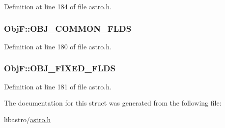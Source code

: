 Definition at line 184 of file astro.\-h.

\hypertarget{struct_obj_f_ac06485a349b8c66de064f281140c3741}{
\subsubsection[{O\-B\-J\-\_\-\-C\-O\-M\-M\-O\-N\-\_\-\-F\-L\-D\-S}]{\setlength{\rightskip}{0pt plus 5cm}Obj\-F\-::\-O\-B\-J\-\_\-\-C\-O\-M\-M\-O\-N\-\_\-\-F\-L\-D\-S}}\label{struct_obj_f_ac06485a349b8c66de064f281140c3741}


Definition at line 180 of file astro.\-h.

\hypertarget{struct_obj_f_a97411dd8e4c88e38ef9dd489836fe350}{
\subsubsection[{O\-B\-J\-\_\-\-F\-I\-X\-E\-D\-\_\-\-F\-L\-D\-S}]{\setlength{\rightskip}{0pt plus 5cm}Obj\-F\-::\-O\-B\-J\-\_\-\-F\-I\-X\-E\-D\-\_\-\-F\-L\-D\-S}}\label{struct_obj_f_a97411dd8e4c88e38ef9dd489836fe350}


Definition at line 181 of file astro.\-h.



The documentation for this struct was generated from the following file\-:\begin{DoxyCompactItemize}
\item 
libastro/\hyperlink{astro_8h}{astro.\-h}\end{DoxyCompactItemize}
